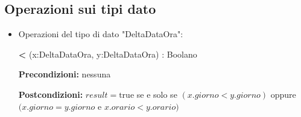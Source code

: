 \documentclass[a4paper]{scrartcl}
\begin{document}
\subsection{Operazioni sui tipi dato}
\begin{itemize}
    \item {Operazioni del tipo di dato "DeltaDataOra":}
    
    \textbf{<} (x:DeltaDataOra, y:DeltaDataOra) : Boolano
    
    \textbf{Precondizioni:} nessuna
    
    \textbf{Postcondizioni:} 
    $result = \text{true}$ se e solo se $(x.giorno < y.giorno)$ oppure $(x.giorno = y.giorno$ e $x.orario < y.orario)$
\end{itemize}

\end{document}
